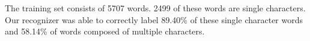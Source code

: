 The training set consists of 5707 words. 2499 of these words are single characters. Our recognizer was able to correctly label 89.40\% of these single character words and 58.14\% of words composed of multiple characters. 